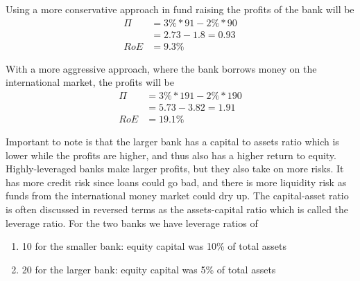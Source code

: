 \documentclass{beamer}
\begin{document}
\begin{frame}
  Using a more conservative approach in fund raising the profits of the bank will be
\begin{align*}
  \Pi &= 3\%*91 - 2\%*90\\
      &= 2.73   - 1.8 =0.93\\
  RoE &= 9.3\%
\end{align*}

With a more aggressive approach, where the bank borrows money on the international market, the profits will be 
\begin{align*}
  \Pi &= 3\%*191 - 2\%*190\\
      &= 5.73    - 3.82 =1.91\\
  RoE &=19.1\%
\end{align*}
\end{frame}

\begin{frame}
  Important to note is that the larger bank has a capital to assets ratio which is lower while the profits are higher, and thus also has a higher return to equity.
  Highly-leveraged banks make larger profits, but they also take on more risks. 
It has more credit risk since loans could go bad, and there is more liquidity risk as funds from the international money market could dry up.
The capital-asset ratio is often discussed in reversed terms as the assets-capital ratio which is called the leverage ratio.
For the two banks we have leverage ratios of
\begin{enumerate}
  \item 10 for the smaller bank: equity capital was 10\% of total assets 
  \item 20 for the larger bank: equity capital was 5\% of total assets 
\end{enumerate}

\end{frame}
\end{document}
